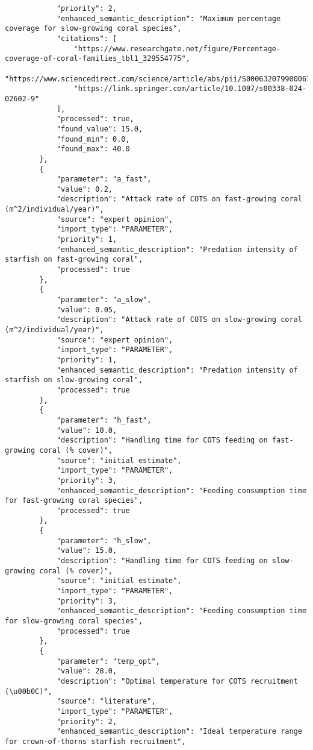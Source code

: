 \begin{lstlisting}
            "priority": 2,
            "enhanced_semantic_description": "Maximum percentage coverage for slow-growing coral species",
            "citations": [
                "https://www.researchgate.net/figure/Percentage-coverage-of-coral-families_tbl1_329554775",
                "https://www.sciencedirect.com/science/article/abs/pii/S0006320799000671",
                "https://link.springer.com/article/10.1007/s00338-024-02602-9"
            ],
            "processed": true,
            "found_value": 15.0,
            "found_min": 0.0,
            "found_max": 40.0
        },
        {
            "parameter": "a_fast",
            "value": 0.2,
            "description": "Attack rate of COTS on fast-growing coral (m^2/individual/year)",
            "source": "expert opinion",
            "import_type": "PARAMETER",
            "priority": 1,
            "enhanced_semantic_description": "Predation intensity of starfish on fast-growing coral",
            "processed": true
        },
        {
            "parameter": "a_slow",
            "value": 0.05,
            "description": "Attack rate of COTS on slow-growing coral (m^2/individual/year)",
            "source": "expert opinion",
            "import_type": "PARAMETER",
            "priority": 1,
            "enhanced_semantic_description": "Predation intensity of starfish on slow-growing coral",
            "processed": true
        },
        {
            "parameter": "h_fast",
            "value": 10.0,
            "description": "Handling time for COTS feeding on fast-growing coral (% cover)",
            "source": "initial estimate",
            "import_type": "PARAMETER",
            "priority": 3,
            "enhanced_semantic_description": "Feeding consumption time for fast-growing coral species",
            "processed": true
        },
        {
            "parameter": "h_slow",
            "value": 15.0,
            "description": "Handling time for COTS feeding on slow-growing coral (% cover)",
            "source": "initial estimate",
            "import_type": "PARAMETER",
            "priority": 3,
            "enhanced_semantic_description": "Feeding consumption time for slow-growing coral species",
            "processed": true
        },
        {
            "parameter": "temp_opt",
            "value": 28.0,
            "description": "Optimal temperature for COTS recruitment (\u00b0C)",
            "source": "literature",
            "import_type": "PARAMETER",
            "priority": 2,
            "enhanced_semantic_description": "Ideal temperature range for crown-of-thorns starfish recruitment",

\end{lstlisting}
